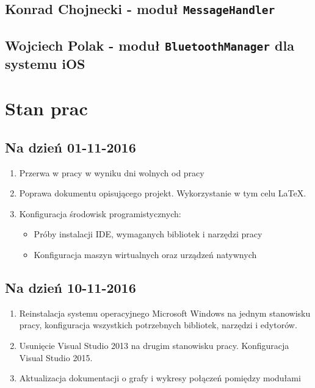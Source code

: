 \documentclass[a4paper, titlepage]{article}
\begin{document}
\subsection{Konrad Chojnecki - moduł \texttt{MessageHandler}}
\label{sec-2-3}
\subsection{Wojciech Polak - moduł \texttt{BluetoothManager} dla systemu iOS}
\label{sec-2-4}
\section{Stan prac}
\label{sec-3}
\subsection{Na dzień 01-11-2016}
\label{sec-3-1}
\begin{enumerate}
\item Przerwa w pracy w wyniku dni wolnych od pracy
\item Poprawa dokumentu opisującego projekt. Wykorzystanie w tym celu \LaTeX{}.
\item Konfiguracja środowisk programistycznych:
\begin{itemize}
\item Próby instalacji IDE, wymaganych bibliotek i narzędzi pracy
\item Konfiguracja maszyn wirtualnych oraz urządzeń natywnych
\end{itemize}
\end{enumerate}
\subsection{Na dzień 10-11-2016}
\label{sec-3-2}
\begin{enumerate}
\item Reinstalacja systemu operacyjnego Microsoft Windows na jednym stanowisku pracy, konfiguracja wszystkich potrzebnych bibliotek, narzędzi i edytorów.
\item Usunięcie Visual Studio 2013 na drugim stanowisku pracy. Konfiguracja Visual Studio 2015.
\item Aktualizacja dokumentacji o grafy i wykresy połączeń pomiędzy modułami
\end{enumerate}
\end{document}
